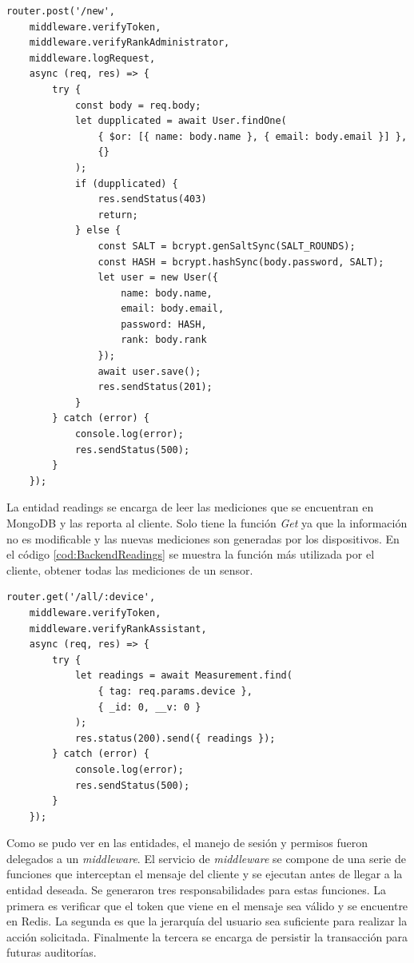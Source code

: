 \begin{lstlisting}[label=cod:BackendLogs,caption=Creación de usuario de la entidad users]
router.post('/new',
    middleware.verifyToken,
    middleware.verifyRankAdministrator,
    middleware.logRequest,
    async (req, res) => {
        try {
            const body = req.body;
            let dupplicated = await User.findOne(
                { $or: [{ name: body.name }, { email: body.email }] },
                {}
            );
            if (dupplicated) {
                res.sendStatus(403)
                return;
            } else {
                const SALT = bcrypt.genSaltSync(SALT_ROUNDS);
                const HASH = bcrypt.hashSync(body.password, SALT);
                let user = new User({
                    name: body.name,
                    email: body.email,
                    password: HASH,
                    rank: body.rank
                });
                await user.save();
                res.sendStatus(201);
            }
        } catch (error) {
            console.log(error);
            res.sendStatus(500);
        }
    });
\end{lstlisting}

La entidad readings se encarga de leer las mediciones que se encuentran en MongoDB y las reporta al cliente.
Solo tiene la función \emph{Get} ya que la información no es modificable y las nuevas mediciones son generadas por los dispositivos.
En el código \ref{cod:BackendReadings} se muestra la función más utilizada por el cliente, obtener todas las mediciones de un sensor.

\begin{lstlisting}[label=cod:BackendReadings,caption=Función más utilizada de la entidad readings]
router.get('/all/:device',
    middleware.verifyToken,
    middleware.verifyRankAssistant,
    async (req, res) => {
        try {
            let readings = await Measurement.find(
                { tag: req.params.device },
                { _id: 0, __v: 0 }
            );
            res.status(200).send({ readings });
        } catch (error) {
            console.log(error);
            res.sendStatus(500);
        }
    });
\end{lstlisting}

Como se pudo ver en las entidades, el manejo de sesión y permisos fueron delegados a un \emph{middleware}.
El servicio de \emph{middleware} se compone de una serie de funciones que interceptan el mensaje del cliente y se ejecutan antes de llegar a la entidad deseada.
Se generaron tres responsabilidades para estas funciones.
La primera es verificar que el token que viene en el mensaje sea válido y se encuentre en Redis.
La segunda es que la jerarquía del usuario sea suficiente para realizar la acción solicitada.
Finalmente la tercera se encarga de persistir la transacción para futuras auditorías.

